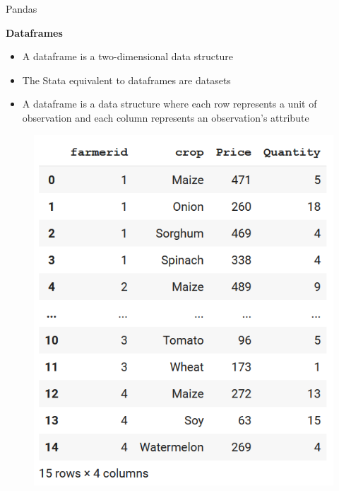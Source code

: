 \documentclass[aspectratio=169]{beamer}
\begin{document}
\begin{frame}{Pandas}

	\textbf{Dataframes}

	\begin{multicols}{2}
	
		\begin{itemize}
			\item A dataframe is a two-dimensional data structure
			\item The Stata equivalent to dataframes are datasets
			\item A dataframe is a data structure where each row represents a unit of observation and each column represents an observation's attribute		
		\end{itemize}

		\begin{figure}
			\centering
			\includegraphics[width=0.8\linewidth]{img/dataframe.png}
		\end{figure}

	\end{multicols}

\end{frame}
\end{document}
